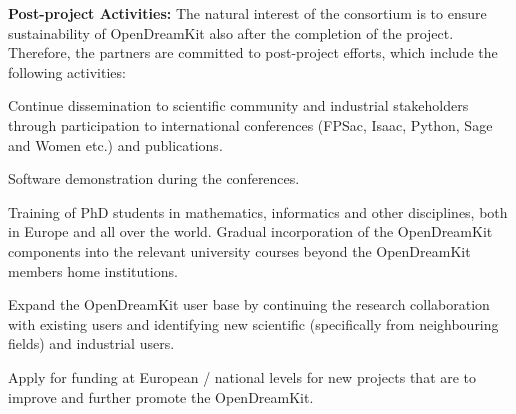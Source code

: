 
{\bf Post-project Activities:} The natural interest of the consortium is to ensure sustainability of OpenDreamKit also after the completion of the project. Therefore, the partners are committed to post-project efforts, which include the following activities: 
\begin{compactenum}
\item Continue dissemination to scientific community and industrial stakeholders through participation to international conferences (FPSac, Isaac, Python, Sage and Women etc.) and publications.
\item Software demonstration during the conferences.
\item Training of  PhD students in mathematics, informatics and other disciplines, both in Europe and all over the world. Gradual incorporation of the OpenDreamKit components into the relevant university courses beyond the OpenDreamKit members home institutions.
\item Expand the OpenDreamKit user base by continuing the research collaboration with existing users and  identifying new scientific (specifically from neighbouring fields) and industrial users.
\item Apply for funding at European / national levels for new projects that are to improve and further promote the OpenDreamKit.
\end{compactenum}


